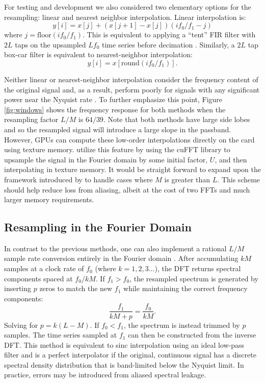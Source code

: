 For testing and development we also considered two elementary options for the resampling: linear and nearest 
neighbor interpolation.  Linear interpolation is:
\begin{equation}
y[i] = x[j] + (x[j+1] - x[j]) (if_0/f_1 - j)
\end{equation}
where $j = \mathrm{floor}(if_0/f_1)$.  This is equivalent to applying a ``tent'' FIR filter with $2L$ taps on the 
upsampled $Lf_0$ time series before decimation \citep{oppenheim10}.  Similarly, a $2L$ tap box-car filter is 
equivalent to nearest-neighbor interpolation:
\begin{equation}
y[i] = x[\mathrm{round}(if_0/f_1)].
\end{equation}

Neither linear or nearest-neighbor interpolation consider the frequency content of the original signal and, as a 
result, perform poorly for signals with any significant power near the Nyquist rate \citep{fraser89}.  To further 
emphasize this point, Figure 
\ref{fig:windows} shows the frequency response for both methods when 
the resampling factor $L/M$ is $64/39$.  Note that both methods have large side lobes and so the 
resampled signal will introduce a large slope in the passband.  However, GPUs can compute 
these low-order interpolations directly on the card using texture memory.  \citet{kim14b} utilize this feature 
by using the cuFFT library to upsample the signal in the Fourier domain by some initial factor, $U$, and then 
interpolating in texture memory.  It would be straight forward to 
expand upon the framework introduced by \citet{kim14b} to handle cases where $M$ is greater than $L$.  
This scheme should help reduce loss from aliasing, albeit 
at the cost of two FFTs and much larger memory requirements.

 
\subsection{Resampling in the Fourier Domain} \label{sec:fourier_resampling}
In contrast to the previous methods, one can also implement a rational $L/M$ sample rate conversion entirely in 
the Fourier domain \citep{gold69}.  After accumulating $kM$ samples at a clock rate of $f_0$ 
(where $k=1,2,3\ldots$), the DFT 
returns spectral components spaced at $f_0/kM$.  If $f_1 > f_0$, the resampled spectrum is generated by inserting
$p$ zeros to match the new $f_1$ while maintaining the correct frequency components: 
\begin{equation}
\frac{f_1}{kM+p} = \frac{f_0}{kM}.
\end{equation} 
Solving for $p = k(L - M)$.  If $f_0 < f_1$, the spectrum is instead trimmed by $p$ samples.  The time series
sampled at $f_1$ can then be constructed from the inverse DFT.  This method is equivalent to sinc 
interpolation using an ideal low-pass filter and is a perfect interpolator
if the original, continuous signal has a discrete spectral density distribution that is band-limited below the 
Nyquist limit.  In practice, errors may be introduced from aliased spectral leakage. 

